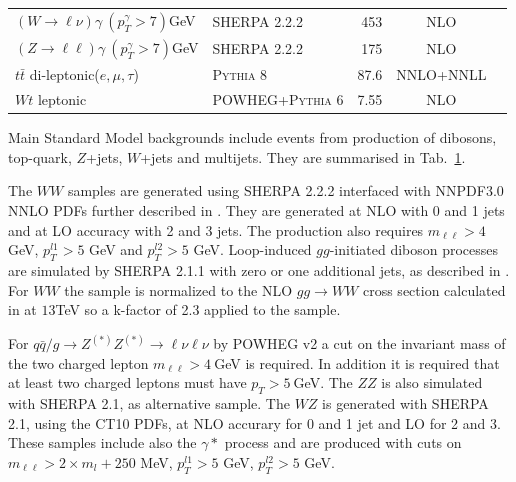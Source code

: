 \begin{table}[h]
{\begin{tabular}{llrcc}
    $(W \to \ell\nu)\gamma~(p_{T}^{\gamma} > 7 )$GeV                 & \textsc{SHERPA} 2.2.2& 453 & NLO\\
    $(Z \to \ell\ell)\gamma~(p_{T}^{\gamma} > 7 )$GeV                & \textsc{SHERPA} 2.2.2& 175 & NLO\\

    $t\bar{t}$ di-leptonic($e,\mu ,\tau$)         & \textsc{Pythia 8} & 87.6 & NNLO+NNLL & \\
    $Wt$ leptonic             & \textsc{POWHEG}+\textsc{Pythia 6} & 7.55 &  NLO & \\
     \hline\hline
  \end{tabular}
  }
  \label{tab:mcsamples}
\end{table}

Main Standard Model backgrounds include events from production of dibosons, top-quark, $Z$+jets, $W$+jets and multijets. They are summarised in Tab.~\ref{tab:mcsamples}. 

The $WW$ samples are generated using \textsc{SHERPA} 2.2.2 interfaced with NNPDF3.0 NNLO PDFs further described in \cite{Cascioli:2013gfa}. They are generated at NLO with 0 and 1 jets and at LO accuracy with 2 and 3 jets. The production also requires $m_{\ell\ell}>4$ GeV, $p_T^{l1}>5$ GeV and $p_T^{l2}>5$ GeV. Loop-induced $gg$-initiated diboson processes are simulated by \textsc{SHERPA} 2.1.1 with zero or one additional jets, as described in \cite{Cascioli:2013gfa}. For $WW$ the sample is normalized to the NLO $gg\rightarrow WW$ cross section calculated in \cite{Caola:2015rqy} at $13$TeV so a k-factor of 2.3 applied to the sample.

For $q\bar{q}/g{\to}Z^{(\ast)}Z^{(\ast)}{\to}\ell\nu\ell\nu$ by \textsc{POWHEG} v2 a cut on the invariant mass of the two charged lepton $m_{\ell\ell} > 4 ~$GeV is required. In addition it is required that at least two charged leptons must have $p_T > 5 ~$GeV. The $ZZ$ is also simulated with \textsc{SHERPA} 2.1, as alternative sample. The $WZ$ is generated with \textsc{SHERPA} 2.1, using the CT10 PDFs, at NLO accurary for 0 and 1 jet and LO for 2 and 3. These samples include also the $\gamma*$ process and are produced with cuts on $m_{\ell\ell}>2 \times m_{l}+250$ MeV, $p_T^{l1}>5$ GeV, $p_T^{l2}>5$ GeV.


